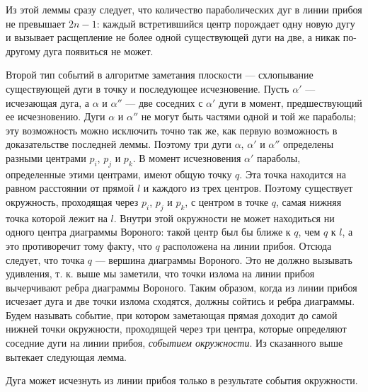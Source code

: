 Из  этой  леммы  сразу  следует,  что  количество  параболических  дуг  в  линии  прибоя  не  превышает $2n-1$:  каждый  встретившийся  центр  порождает  одну  новую дугу  и  вызывает  расщепление  не  более  одной  существующей  дуги  на  две,  а  никак по-другому  дуга  появиться  не  может.

Второй  тип  событий  в  алгоритме  заметания  плоскости  --- схлопывание  существующей  дуги  в  точку  и  последующее  исчезновение.
Пусть  $\alpha'$  --- исчезающая  дуга,  а  $\alpha$ и $\alpha''$ --- две  соседних  с  $\alpha'$  дуги  в  момент,  предшествующий ее  исчезновению.
Дуги  $\alpha$ и $\alpha''$  не  могут  быть  частями  одной  и  той  же  параболы; эту  возможность  можно  исключить  точно  так  же,  как  первую  возможность  в  доказательстве  последней леммы.
Поэтому  три  дуги  $\alpha$,  $\alpha'$ и $\alpha''$  определены  разными  центрами  $p_i$, $p_j$ и $p_k$.
В  момент  исчезновения  $\alpha'$  параболы,  определенные  этими  центрами,  имеют общую  точку  $q$.
Эта  точка  находится  на  равном  расстоянии  от  прямой $l$ и  каждого из  трех  центров.
Поэтому  существует  окружность,  проходящая  через  $p_i$, $p_j$ и $p_k$,  с центром  в  точке  $q$,  самая  нижняя  точка  которой  лежит  на  $l$.
Внутри  этой  окружности  не  может  находиться  ни  одного  центра  диаграммы  Вороного:  такой центр был  бы  ближе  к  $q$,  чем  $q$  к  $l$, а  это  противоречит  тому  факту,  что  $q$  расположена на  линии  прибоя.
Отсюда  следует,  что  точка  $q$ --- вершина  диаграммы  Вороного. 
Это  не  должно  вызывать  удивления,  т.  к.  выше  мы  заметили,  что  точки  излома  на линии  прибоя  вычерчивают  ребра  диаграммы  Вороного.
Таким  образом,  когда  из линии  прибоя  исчезает  дуга  и  две  точки  излома  сходятся,  должны  сойтись  и  ребра 
диаграммы.
Будем  называть  событие,  при  котором  заметающая  прямая  доходит  до самой  нижней  точки  окружности,  проходящей  через  три  центра,  которые  определяют  соседние  дуги  на  линии  прибоя,  \textit{событием  окружности}.
Из  сказанного  выше вытекает  следующая  лемма.

\begin{lemma}
    Дуга  может  исчезнуть  из  линии  прибоя  только  в  результате  события  окружности.
\end{lemma}

